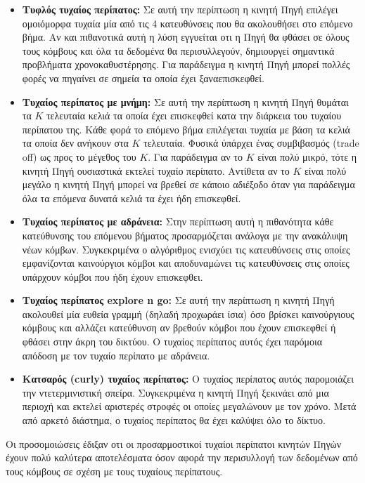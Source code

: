 \begin{itemize}
\item \textbf{Τυφλός τυχαίος περίπατος:} Σε αυτή την περίπτωση η κινητή Πηγή επιλέγει ομοιόμορφα τυχαία μία από τις 4 κατευθύνσεις που θα ακολουθήσει στο επόμενο
βήμα. Αν και πιθανοτικά αυτή η λύση εγγυείται οτι η Πηγή θα φθάσει σε όλους τους κόμβους και όλα τα δεδομένα θα περισυλλεγούν, δημιουργεί σημαντικά προβλήματα
χρονοκαθυστέρησης. Για παράδειγμα η κινητή Πηγή μπορεί πολλές φορές να πηγαίνει σε σημεία τα οποία έχει ξαναεπισκεφθεί.
\item \textbf{Τυχαίος περίπατος με μνήμη:} Σε αυτή την περίπτωση η κινητή Πηγή θυμάται τα $Κ$ τελευταία κελιά τα οποία έχει επισκεφθεί κατα την διάρκεια του τυχαίου
περίπατου της. Κάθε φορά το επόμενο βήμα επιλέγεται τυχαία με βάση τα κελιά τα οποία δεν ανήκουν στα $Κ$ τελευταία. Φυσικά ύπάρχει ένας συμβιβασμός (trade off) ως
προς το μέγεθος του $K$. Για παράδειγμα αν το $K$ είναι πολύ μικρό, τότε η κινητή Πηγή ουσιαστικά εκτελεί τυχαίο περίπατο. Αντίθετα αν το $Κ$ είναι πολύ μεγάλο η
κινητή Πηγή μπορεί να βρεθεί σε κάποιο αδιέξοδο όταν για παράδειγμα όλα τα επόμενα δυνατά κελιά τα έχει ήδη επισκεφθεί.
\item \textbf{Τυχαίος περίπατος με αδράνεια:} Στην περίπτωση αυτή η πιθανότητα κάθε κατεύθυνσης του επόμενου βήματος προσαρμόζεται ανάλογα με την ανακάλυψη νέων
κόμβων. Συγκεκριμένα ο αλγόριθμος ενισχύει τις κατευθύνσεις στις οποίες εμφανίζονται καινούργιοι κόμβοι και αποδυναμώνει τις κατευθύνσεις στις οποίες υπάρχουν κόμβοι
που ήδη έχουν επισκεφθει.
\item \textbf{Τυχαίος περίπατος explore n go:} Σε αυτή την περίπτωση η κινητή Πηγή ακολουθεί μία ευθεία γραμμή (δηλαδή προχωράει ίσια) όσο βρίσκει καινούργιους
κόμβους και αλλάζει κατεύθυνση αν βρεθούν κόμβοι που έχουν επισκεφθεί ή φθάσει στην άκρη του δικτύου. Ο τυχαίος περίπατος αυτός έχει παρόμοια απόδοση με τον τυχαίο
περίπατο με αδράνεια.
\item \textbf{Κατσαρός (curly) τυχαίος περίπατος:} Ο τυχαίος περίπατος αυτός παρομοιάζει την ντετερμινιστική σπείρα. Συγκεκριμένα η κινητή Πηγή ξεκινάει από μια
περιοχή και εκτελεί αριστερές στροφές οι οποίες μεγαλώνουν με τον χρόνο. Μετά από αρκετό διάστημα, ο τυχαίος περίπατος θα έχει καλύψει όλο το δίκτυο.
\end{itemize}

Οι προσομοιώσεις έδιξαν οτι οι προσαρμοστικοί τυχαίοι περίπατοι κινητών Πηγών έχουν πολύ καλύτερα αποτελέσματα όσον αφορά την περισυλλογή των δεδομένων από τους
κόμβους σε σχέση με τους τυχαίους περίπατους.

